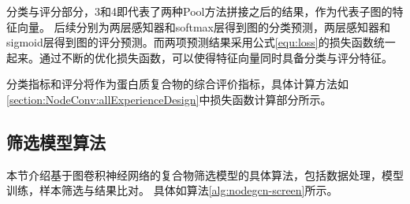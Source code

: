 分类与评分部分，3和4即代表了两种Pool方法拼接之后的结果，作为代表子图的特征向量。
后续分别为两层感知器和softmax层得到图的分类预测，两层感知器和sigmoid层得到图的评分预测。而两项预测结果采用公式\ref{equ:loss}的损失函数统一起来。通过不断的优化损失函数，可以使得特征向量同时具备分类与评分特征。

分类指标和评分将作为蛋白质复合物的综合评价指标，具体计算方法如\ref{section:NodeConv:allExperienceDesign}中损失函数计算部分所示。

\subsection{筛选模型算法}

本节介绍基于图卷积神经网络的复合物筛选模型的具体算法，包括数据处理，模型训练，样本筛选与结果比对。
具体如算法\ref{alg:nodegcn-screen}所示。

